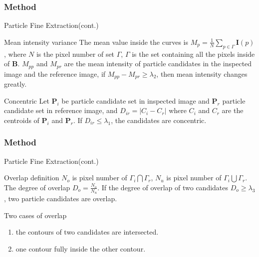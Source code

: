 \documentclass[14pt,hyperref={CJKbookmarks=true}]{beamer}
\theoremstyle{plain}
\theoremstyle{definition}
\theoremstyle{remark}
\begin{document}
\begin{frame}
\small
\frametitle{Method}{Particle Fine Extraction(cont.)}
\begin{block}{Mean intensity variance}
The mean value inside the curves is $M_p = \frac{1}{N}\sum_{p\in\Gamma}\mathbf{I}(p)$, where $N$ is the pixel number of set $\Gamma$, $\Gamma$ is the set containing all the pixels inside of $\mathbf{B}$. $M_{pp}$ and $M_{pr}$ are the mean intensity
of particle candidates in the inspected image and the reference image, if $M_{pp}-M_{pr}\geq \lambda_2$, then mean intensity
changes greatly.
\end{block}
\begin{block}{Concentric}
Let $\mathbf{P}_i$ be particle candidate set in inspected image and $\mathbf{P}_r$ particle candidate set in reference image, and $D_{ir} = |C_i-C_r|$ where $C_i$ and $C_r$ are the centroids of $\mathbf{P}_i$ and $\mathbf{P}_r$. If $D_{ir} \leq \lambda_1$, the candidates are concentric.
\end{block}
\end{frame}
\begin{frame}
\frametitle{Method}{Particle Fine Extraction(cont.)}
\begin{block}{Overlap definition}
$N_o$ is pixel number of $\Gamma_i\bigcap\Gamma_r$, $N_u$ is pixel number of $\Gamma_i\bigcup\Gamma_r$. The degree of overlap  $D_o=\frac{N_o}{N_u}$. If the degree of overlap of two candidates $D_o \geq \lambda_3$,  two particle candidates are overlap.
\end{block}
\begin{block}{Two cases of overlap}
\begin{enumerate}
\item the contours of two candidates are intersected.
\item one contour fully inside the other contour.
\end{enumerate}
\end{block}
\end{frame}
\end{document}
